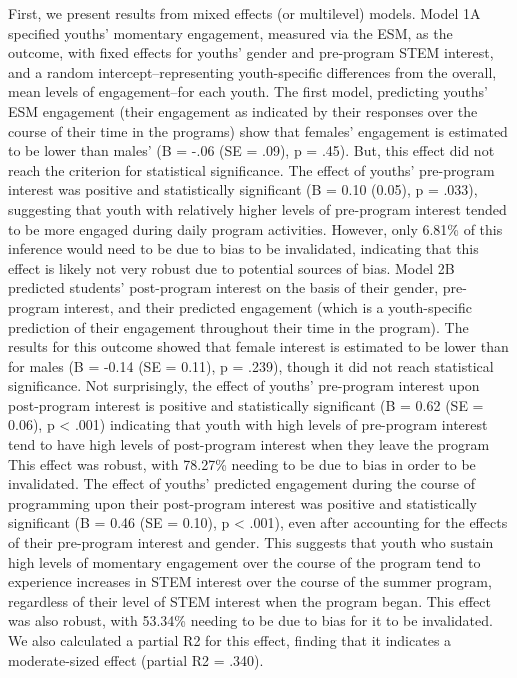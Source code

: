 \documentclass[man]{apa6}
\theoremstyle{definition}
\theoremstyle{definition}
\theoremstyle{definition}
\theoremstyle{remark}
\begin{document}
First, we present results from mixed effects (or multilevel) models.
Model 1A specified youths' momentary engagement, measured via the ESM,
as the outcome, with fixed effects for youths' gender and pre-program
STEM interest, and a random intercept--representing youth-specific
differences from the overall, mean levels of engagement--for each youth.
The first model, predicting youths' ESM engagement (their engagement as
indicated by their responses over the course of their time in the
programs) show that females' engagement is estimated to be lower than
males' (B = -.06 (SE = .09), p = .45). But, this effect did not reach
the criterion for statistical significance. The effect of youths'
pre-program interest was positive and statistically significant (B =
0.10 (0.05), p = .033), suggesting that youth with relatively higher
levels of pre-program interest tended to be more engaged during daily
program activities. However, only 6.81\% of this inference would need to
be due to bias to be invalidated, indicating that this effect is likely
not very robust due to potential sources of bias. Model 2B predicted
students' post-program interest on the basis of their gender,
pre-program interest, and their predicted engagement (which is a
youth-specific prediction of their engagement throughout their time in
the program). The results for this outcome showed that female interest
is estimated to be lower than for males (B = -0.14 (SE = 0.11), p =
.239), though it did not reach statistical significance. Not
surprisingly, the effect of youths' pre-program interest upon
post-program interest is positive and statistically significant (B =
0.62 (SE = 0.06), p \textless{} .001) indicating that youth with high
levels of pre-program interest tend to have high levels of post-program
interest when they leave the program This effect was robust, with
78.27\% needing to be due to bias in order to be invalidated. The effect
of youths' predicted engagement during the course of programming upon
their post-program interest was positive and statistically significant
(B = 0.46 (SE = 0.10), p \textless{} .001), even after accounting for
the effects of their pre-program interest and gender. This suggests that
youth who sustain high levels of momentary engagement over the course of
the program tend to experience increases in STEM interest over the
course of the summer program, regardless of their level of STEM interest
when the program began. This effect was also robust, with 53.34\%
needing to be due to bias for it to be invalidated. We also calculated a
partial R2 for this effect, finding that it indicates a moderate-sized
effect (partial R2 = .340).
\end{document}
